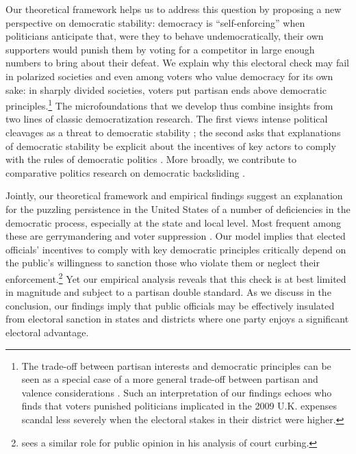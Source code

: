 \documentclass[letterpaper, 12pt]{article}
\begin{document}
\begin{raggedright}
Our theoretical framework helps us to address this question by proposing a new perspective on democratic stability: democracy is ``self-enforcing'' when politicians anticipate that, were they to behave undemocratically, their own supporters would punish them by voting for a competitor in large enough numbers to bring about their defeat. We explain why this electoral check may fail in polarized societies and even among voters who value democracy for its own sake: in sharply divided societies, voters put partisan ends above democratic principles.\footnote{The trade-off between partisan interests and democratic principles can be seen as a special case of a more general trade-off between partisan and valence considerations \citep{AshworthMesquita2009}. Such an interpretation of our findings echoes \citet{Eggers2014a} who finds that voters punished politicians implicated in the 2009 U.K. expenses scandal less severely when the electoral stakes in their district were higher.} The microfoundations that we develop thus combine insights from two lines of classic democratization research. The first views intense political cleavages as a threat to democratic stability \citep{Dahl1956,Lipset1960}; the second asks that explanations of democratic stability be explicit about the incentives of key actors to comply with the rules of democratic politics \citep{przew91,weingast97}. More broadly, we contribute to comparative politics research on democratic backsliding \citep{Gandhi2018,Haggard2016,LuoPrzeworski2018,Nalepa2018,WaldnerLust2018}.

Jointly, our theoretical framework and empirical findings suggest an explanation for the puzzling persistence in the United States of a number of deficiencies in the democratic process, especially at the state and local level. Most frequent among these are gerrymandering \citep{Chen2013,ChoLiu2016} and voter suppression \citep{Grimmer2018}. Our model implies that elected officials' incentives to comply with key democratic principles critically depend on the public's willingness to sanction those who violate them or neglect their enforcement.\footnote{\citet{Clark2009} sees a similar role for public opinion in his analysis of court curbing.} Yet our empirical analysis reveals that this check is at best limited in magnitude and subject to a partisan double standard. As we discuss in the conclusion, our findings imply that public officials may be effectively insulated from electoral sanction in states and districts where one party enjoys a significant electoral advantage.


\end{raggedright}
\end{document}
